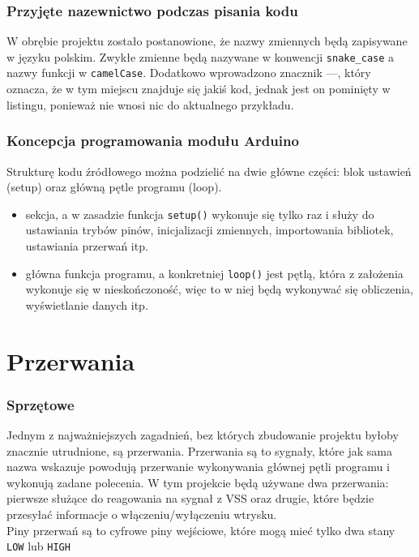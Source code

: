 \subsubsection{Przyjęte nazewnictwo podczas pisania kodu}
W obrębie projektu zostało postanowione, że nazwy zmiennych będą zapisywane w języku polskim. Zwykłe zmienne będą nazywane w konwencji \texttt{snake\_case} a nazwy funkcji w \texttt{camelCase}. Dodatkowo wprowadzono znacznik ---, który oznacza, że w tym miejscu znajduje się jakiś kod, jednak jest on pominięty w listingu, ponieważ nie wnosi nic do aktualnego przykładu.

\subsubsection{Koncepcja programowania modułu Arduino}
Strukturę kodu źródłowego można podzielić na dwie główne części: blok ustawień (setup) oraz główną pętle programu (loop).
\begin{itemize}
\item{sekcja, a w zasadzie funkcja \texttt{setup()} wykonuje się tylko raz i służy do ustawiania trybów pinów, inicjalizacji zmiennych, importowania bibliotek, ustawiania przerwań itp.}
\item{główna funkcja programu, a konkretniej \texttt{loop()} jest pętlą, która z założenia wykonuje się w nieskończoność, więc to w niej będą wykonywać się obliczenia, wyświetlanie danych itp.}
\end{itemize}

\section{Przerwania}
\subsubsection{Sprzętowe}
Jednym z najważniejszych zagadnień, bez których zbudowanie projektu byłoby znacznie utrudnione, są przerwania. Przerwania są to sygnały, które jak sama nazwa wskazuje powodują przerwanie wykonywania głównej pętli programu i wykonują zadane polecenia. W tym projekcie będą używane dwa przerwania: pierwsze służące do reagowania na sygnał z VSS oraz drugie, które będzie przesyłać informacje o włączeniu/wyłączeniu wtrysku.\\

Piny przerwań są to cyfrowe piny wejściowe, które mogą mieć tylko dwa stany \texttt{LOW} lub \texttt{HIGH}\\

